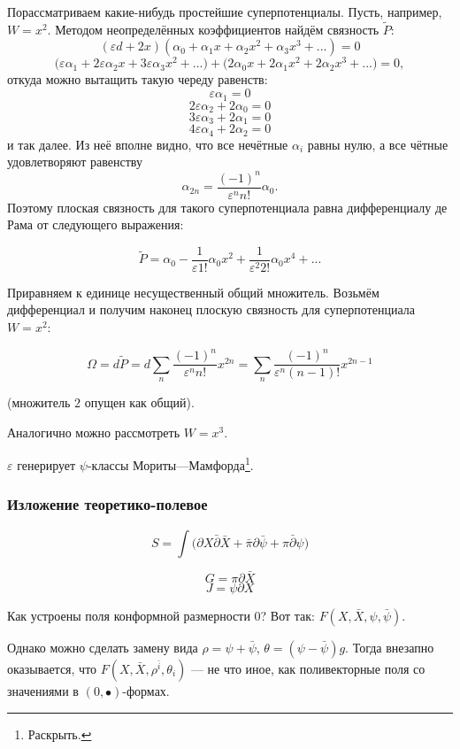 \documentclass[11pt]{article}
\def\p{\partial}
\theoremstyle{remark}
\theoremstyle{definition}
\newcommand{\que}[1]{\footnote{\textcolor[rgb]{0.38,0.69,0.82}{#1}}}
\begin{document}
Порассматриваем какие-нибудь простейшие суперпотенциалы. Пусть, например, $W = x^2$. Методом неопределённых коэффициентов найдём связность $\tilde P$: $$(\varepsilon d + 2x) (\alpha_0 + \alpha_1 x + \alpha_2 x^2 + \alpha_3 x^3 + ...) = 0$$ $$\Big(\varepsilon \alpha_1 + 2 \varepsilon \alpha_2 x + 3 \varepsilon \alpha_3 x^2 + ...\Big) + \Big(2 \alpha_0 x + 2 \alpha_1 x^2 + 2 \alpha_2 x^3 + ...\Big) = 0,$$ откуда можно вытащить такую череду равенств: $$\varepsilon \alpha_1 = 0$$
$$2 \varepsilon \alpha_2 + 2 \alpha_0 = 0$$
$$3 \varepsilon \alpha_3 + 2 \alpha_1 = 0$$
$$4 \varepsilon \alpha_4 + 2 \alpha_2 = 0$$
 и так далее. Из неё вполне видно, что все нечётные $\alpha_i$ равны нулю, а все чётные удовлетворяют равенству $$\alpha_{2n} = \frac{(-1)^n}{\varepsilon^n n!} \alpha_0.$$ Поэтому плоская связность для такого суперпотенциала равна дифференциалу де Рама от следующего выражения:

 $$\tilde P = \alpha_0 - \frac{1}{\varepsilon 1!} \alpha_0 x^2 + \frac{1}{\varepsilon^2 2!} \alpha_0 x^4 + ...$$

 Приравняем к единице несущественный общий множитель. Возьмём дифференциал и получим наконец плоскую связность для суперпотенциала $W = x^2$:

$$\Omega = d\tilde P = d \sum\limits_n \frac{(-1)^n}{\varepsilon^n n!} x^{2n} = \boxed{\sum\limits_n \frac{(-1)^n}{\varepsilon^n (n-1)!} x^{2n-1} }$$

 (множитель $2$ опущен как общий).

Аналогично можно рассмотреть $W = x^3$.





$\varepsilon$ генерирует $\psi$-классы Мориты---Мамфорда\que{Раскрыть.}.


\subsubsection{Изложение теоретико-полевое}

$$S = \int \Big( \p X \bar \p \bar X + \bar \pi \p \bar \psi + \pi \bar \p \psi  \Big)$$

$$G = \pi \p \bar X$$
$$J = \psi \p X$$

Как устроены поля конформной размерности 0? Вот так: $F(X, \bar X, \psi, \bar \psi)$.

Однако можно сделать замену вида $\rho = \psi + \bar \psi$, $\theta = (\psi - \bar \psi) g$. Тогда внезапно оказывается, что $F(X, \bar X, \rho^{\bar i}, \theta_i)$ --- не что иное, как поливекторные поля со значениями в $(0,\bullet)$-формах.
\end{document}
